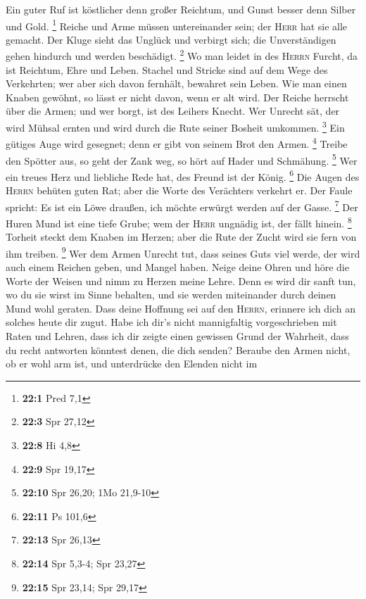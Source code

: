  Ein guter Ruf ist köstlicher denn großer Reichtum, und
Gunst besser denn Silber und Gold. \footnote{\textbf{22:1} Pred 7,1}
 Reiche und Arme müssen untereinander sein; der
\textsc{Herr} hat sie alle gemacht.  Der Kluge sieht das
Unglück und verbirgt sich; die Unverständigen gehen hindurch und werden
beschädigt. \footnote{\textbf{22:3} Spr 27,12}  Wo man
leidet in des \textsc{Herrn} Furcht, da ist Reichtum, Ehre und Leben.
 Stachel und Stricke sind auf dem Wege des Verkehrten; wer
aber sich davon fernhält, bewahret sein Leben.  Wie man
einen Knaben gewöhnt, so lässt er nicht davon, wenn er alt wird.
 Der Reiche herrscht über die Armen; und wer borgt, ist
des Leihers Knecht.  Wer Unrecht sät, der wird Mühsal
ernten und wird durch die Rute seiner Bosheit umkommen. \footnote{\textbf{22:8}
  Hi 4,8}  Ein gütiges Auge wird gesegnet; denn er gibt
von seinem Brot den Armen. \footnote{\textbf{22:9} Spr 19,17}
 Treibe den Spötter aus, so geht der Zank weg, so hört
auf Hader und Schmähung. \footnote{\textbf{22:10} Spr 26,20; 1Mo 21,9-10}
 Wer ein treues Herz und liebliche Rede hat, des Freund
ist der König. \footnote{\textbf{22:11} Ps 101,6}  Die
Augen des \textsc{Herrn} behüten guten Rat; aber die Worte des
Verächters verkehrt er.  Der Faule spricht: Es ist ein
Löwe draußen, ich möchte erwürgt werden auf der Gasse. \footnote{\textbf{22:13}
  Spr 26,13}  Der Huren Mund ist eine tiefe Grube; wem
der \textsc{Herr} ungnädig ist, der fällt hinein. \footnote{\textbf{22:14}
  Spr 5,3-4; Spr 23,27}  Torheit steckt dem Knaben im
Herzen; aber die Rute der Zucht wird sie fern von ihm treiben.
\footnote{\textbf{22:15} Spr 23,14; Spr 29,17}  Wer dem
Armen Unrecht tut, dass seines Guts viel werde, der wird auch einem
Reichen geben, und Mangel haben.  Neige deine Ohren und
höre die Worte der Weisen und nimm zu Herzen meine Lehre.
 Denn es wird dir sanft tun, wo du sie wirst im Sinne
behalten, und sie werden miteinander durch deinen Mund wohl geraten.
 Dass deine Hoffnung sei auf den \textsc{Herrn}, erinnere
ich dich an solches heute dir zugut.  Habe ich dir's
nicht mannigfaltig vorgeschrieben mit Raten und Lehren, 
dass ich dir zeigte einen gewissen Grund der Wahrheit, dass du recht
antworten könntest denen, die dich senden?  Beraube den
Armen nicht, ob er wohl arm ist, und unterdrücke den Elenden nicht im
